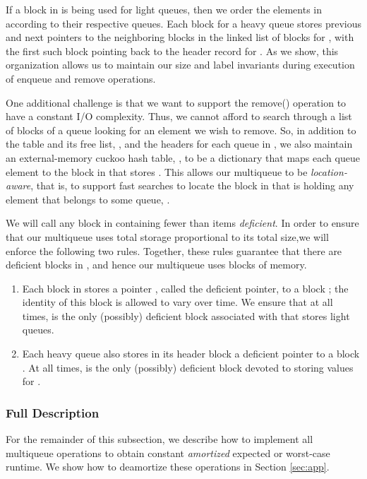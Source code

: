 \documentclass[11pt,letterpaper]{article}
\begin{document}
If a block  in  is being used for light queues, 
then we order the elements in  according to their respective queues.
Each block for a heavy queue  stores previous and next pointers to the
neighboring blocks in the linked list of blocks for , with 
the first such block pointing back to the header record for .
As we show, this organization allows us to maintain our size and label
invariants during execution of enqueue and remove operations.

One additional challenge is that we want to support the remove() operation
to have a constant I/O complexity.
Thus, we cannot afford to search through a list of blocks of a queue looking
for an element  we wish to remove.
So, in addition to the table  and its free list, ,
and the headers for each queue in ,
we also maintain an external-memory 
cuckoo hash table, , to be a dictionary that
maps each queue element  to the block in  that stores .
This allows our multiqueue to be \emph{location-aware}, that is, to
support fast searches to locate the block in  that is holding
any element  that belongs to some queue, .

We will call any block in  containing fewer than  items \emph{deficient}. 
In order to ensure that our multiqueue uses total storage proportional to its total size,we will enforce the following two rules. Together, these rules guarantee that there are  deficient blocks in , and hence our 
multiqueue uses  blocks of memory.
\begin{enumerate}
\item Each
block  in  stores a pointer , called the deficient pointer, to 
a block ; the identity of this block is allowed to vary over time. We ensure that at all times,  is the only (possibly) deficient block associated with  that stores light queues.
\item Each heavy queue  also stores in its header block a deficient pointer  to a block . At all times,  is the only (possibly) deficient block devoted to
storing values for .
\end{enumerate} 

\subsubsection{Full Description}
\label{sec:basic}
For the remainder of this subsection, we describe how to implement all multiqueue operations
to obtain constant  \emph{amortized} expected or worst-case runtime. We show how to
deamortize these operations in Section \ref{sec:app}.
\end{document}
